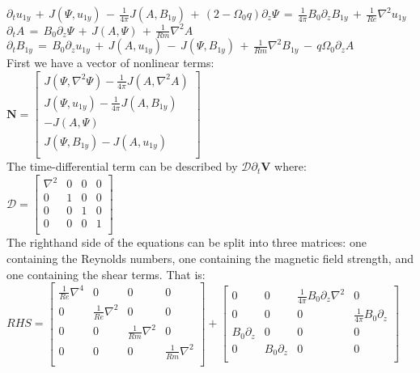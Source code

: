 \documentclass[letterpaper,12pt]{article}
\newcommand\reye{\mathrel{Re}}
\newcommand\reym{\mathrel{Rm}}
\begin{document}
$\partial_t u_{1y} \, + \, J\left(\Psi, u_{1y}\right) \, - \, \frac{1}{4\pi} J\left(A, B_{1y}\right) \, + \, \left(2 - \Omega_0 q\right) \partial_z \Psi \, = \, \frac{1}{4\pi}B_0\partial_z B_{1y} \, + \, \frac{1}{\reye} \nabla^2 u_{1y}$ \\

$\partial_t A \, = \, B_0 \partial_z \Psi \, + \, J\left(A, \Psi\right) \, + \, \frac{1}{Rm} \nabla^2 A$ \\

$\partial_t B_{1y} \, = \, B_0 \partial_z u_{1y} \, + \, J\left(A, u_{1y}\right) \, - \, J\left(\Psi, B_{1y}\right) \, + \, \frac{1}{\reym} \nabla^2 B_{1y}  \, - \, q \Omega_0 \partial_z A$ \\

First we have a vector of nonlinear terms:\\

$\mathbf{N} = \left[ \begin{matrix}  J(\Psi, \nabla^2 \Psi) - \frac{1}{4\pi}J(A, \nabla^2 A)\\
J(\Psi, u_{1y}) - \frac{1}{4\pi} J(A, B_{1y}) \\ 
-J(A, \Psi) \\
J(\Psi, B_{1y}) - J(A, u_{1y}) \\
\end{matrix} \right]$ \\

The time-differential term can be described by $\mathcal{D}\partial_t \mathbf{V}$ where: \\

$\mathcal{D} = \left[\begin{matrix}
\nabla^2 & 0 & 0 & 0 \\
0 & 1& 0 & 0 \\
0 & 0 & 1 & 0\\
0 & 0 & 0 & 1 \\
\end{matrix}\right]$ \\

The righthand side of the equations can be split into three matrices: one containing the Reynolds numbers, one containing the magnetic field strength, and one containing the shear terms. That is: \\

$RHS = \left[\begin{matrix}
\frac{1}{\reye} \nabla^4 & 0 & 0 & 0 \\
0 & \frac{1}{\reye}\nabla^2 & 0 & 0 \\
0 & 0 & \frac{1}{\reym}\nabla^2 & 0 \\
0 & 0 & 0 & \frac{1}{\reym}\nabla^2 \\ 
\end{matrix}\right] + \left[\begin{matrix}
0 & 0 & \frac{1}{4\pi}B_0 \partial_z \nabla^2 & 0 \\
0 & 0 & 0 & \frac{1}{4\pi} B_0 \partial_z \\
B_0 \partial_z & 0 & 0 & 0 \\
0 & B_0 \partial_z & 0 & 0 \\ \end{matrix}\right]$ \\
\end{document}
